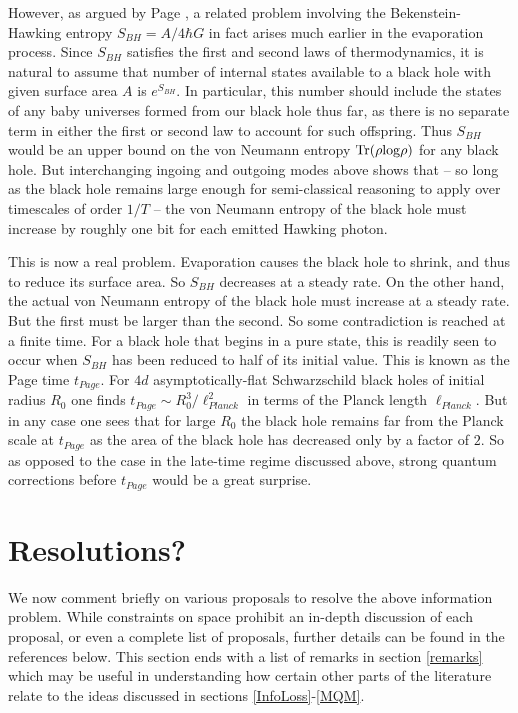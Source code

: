\documentclass[10pt]{article}
\begin{document}
However, as argued by Page \cite{Page:1993df}, a related problem involving the Bekenstein-Hawking entropy
$S_{BH} = A/4\hbar G$ in fact arises much earlier in the evaporation process.  Since $S_{BH}$ satisfies the first and second laws of thermodynamics, it is natural to assume that number of internal states available to a black hole with given surface area $A$ is $e^{S_{BH}}$.  In particular, this number should include the states of any baby universes formed from our black hole thus far, as there is no separate term in either the first or second law to account for such offspring.  Thus $S_{BH}$ would be an upper bound on the von Neumann entropy $\rm{Tr} (\rho {\rm log} \rho)$ for any black hole.  But interchanging ingoing and outgoing modes above shows that -- so long as the black hole remains large enough for semi-classical reasoning to apply over timescales of order $1/T$ -- the von Neumann entropy of the black hole must increase by roughly one bit for each emitted Hawking photon.

This is now a real problem.  Evaporation causes the black hole to shrink, and thus to reduce its surface area.  So $S_{BH}$ decreases at a steady rate.  On the other hand, the actual von Neumann entropy of the black hole must increase at a steady rate.  But the first must be larger than the second.   So some contradiction is reached at a finite time.  For a black hole that begins in a pure state, this is readily seen to occur when $S_{BH}$ has been reduced to half of its initial value.  This is known as the Page time $t_{Page}$.  For $4d$ asymptotically-flat Schwarzschild black holes of initial radius $R_0$ one finds $t_{Page} \sim R_0^3/\ell_{Planck}^2$ in terms of the Planck length $\ell_{Planck}.$   But in any case one sees that for large $R_0$ the black hole remains far from the Planck scale at $t_{Page}$ as the area of the black hole has decreased only by a factor of $2$.  So as opposed to the case in the late-time regime discussed above, strong quantum corrections before $t_{Page}$ would be a great surprise.

\section{Resolutions?}
\label{proposals}

We now comment briefly on various proposals to resolve the above information problem.  While constraints on space prohibit an in-depth discussion of each proposal, or even a complete list of proposals, further details can be found in the references below.  This section ends with a list of remarks in section \ref{remarks} which may be useful in understanding how certain other parts of the literature relate to the ideas discussed in sections \ref{InfoLoss}-\ref{MQM}.
\end{document}
